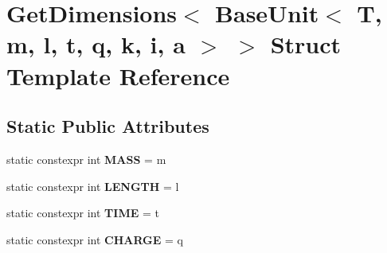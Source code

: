\hypertarget{structGetDimensions_3_01BaseUnit_3_01T_00_01m_00_01l_00_01t_00_01q_00_01k_00_01i_00_01a_01_4_01_4}{}\section{Get\+Dimensions$<$ Base\+Unit$<$ T, m, l, t, q, k, i, a $>$ $>$ Struct Template Reference}
\label{structGetDimensions_3_01BaseUnit_3_01T_00_01m_00_01l_00_01t_00_01q_00_01k_00_01i_00_01a_01_4_01_4}
\subsection*{Static Public Attributes}
\begin{DoxyCompactItemize}
\item 
\hypertarget{structGetDimensions_3_01BaseUnit_3_01T_00_01m_00_01l_00_01t_00_01q_00_01k_00_01i_00_01a_01_4_01_4_a4838735cade52fdc3ab7dcdcbc482dd6}{}\label{structGetDimensions_3_01BaseUnit_3_01T_00_01m_00_01l_00_01t_00_01q_00_01k_00_01i_00_01a_01_4_01_4_a4838735cade52fdc3ab7dcdcbc482dd6} 
static constexpr int {\bfseries M\+A\+SS} = m
\item 
\hypertarget{structGetDimensions_3_01BaseUnit_3_01T_00_01m_00_01l_00_01t_00_01q_00_01k_00_01i_00_01a_01_4_01_4_a103b25fdbcc22d9441b788a65a7e7d15}{}\label{structGetDimensions_3_01BaseUnit_3_01T_00_01m_00_01l_00_01t_00_01q_00_01k_00_01i_00_01a_01_4_01_4_a103b25fdbcc22d9441b788a65a7e7d15} 
static constexpr int {\bfseries L\+E\+N\+G\+TH} = l
\item 
\hypertarget{structGetDimensions_3_01BaseUnit_3_01T_00_01m_00_01l_00_01t_00_01q_00_01k_00_01i_00_01a_01_4_01_4_a5da92dbedc4d2ffa9f84985d3da0d3e2}{}\label{structGetDimensions_3_01BaseUnit_3_01T_00_01m_00_01l_00_01t_00_01q_00_01k_00_01i_00_01a_01_4_01_4_a5da92dbedc4d2ffa9f84985d3da0d3e2} 
static constexpr int {\bfseries T\+I\+ME} = t
\item 
\hypertarget{structGetDimensions_3_01BaseUnit_3_01T_00_01m_00_01l_00_01t_00_01q_00_01k_00_01i_00_01a_01_4_01_4_aabb671f5c226b4877186c0d8d6d9fe9c}{}\label{structGetDimensions_3_01BaseUnit_3_01T_00_01m_00_01l_00_01t_00_01q_00_01k_00_01i_00_01a_01_4_01_4_aabb671f5c226b4877186c0d8d6d9fe9c} 
static constexpr int {\bfseries C\+H\+A\+R\+GE} = q
\item 
\hypertarget{structGetDimensions_3_01BaseUnit_3_01T_00_01m_00_01l_00_01t_00_01q_00_01k_00_01i_00_01a_01_4_01_4_a31527abeefc2aec1fadcb7d155a7a9bd}{}\label{structGetDimensions_3_01BaseUnit_3_01T_00_01m_00_01l_00_01t_00_01q_00_01k_00_01i_00_01a_01_4_01_4_a31527abeefc2aec1fadcb7d155a7a9bd} 

\end{DoxyCompactItemize}
